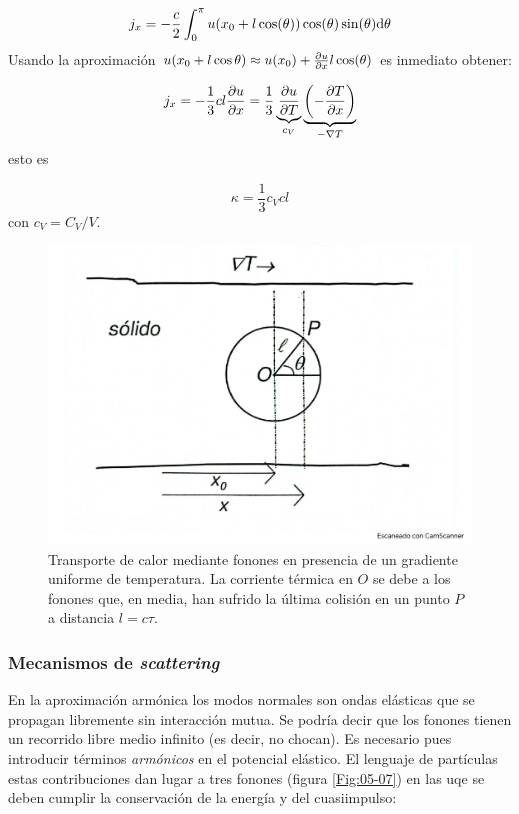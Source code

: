 \begin{equation}
    j_x = - \frac{c}{2} \int_0^\pi u (x_0 + l \cos (\theta)) \cos (\theta) \sin (\theta) \mathrm{d} \theta
\end{equation}
Usando la aproximación $u(x_0+l\cos \theta) \approx u(x_0) + \frac{\partial u}{\partial x} l \cos(\theta)$ es inmediato obtener:

\begin{equation}
j_x = - \frac{1}{3} cl \frac{\partial u}{\partial x} = \frac{1}{3} \underbrace{\frac{\partial u}{\partial T}}_{c_V} \underbrace{\left( -\frac{\partial T}{\partial x} \right)}_{-\nabla T}
\end{equation}
esto es

\begin{equation}
    \kappa = \frac{1}{3} c_V cl
\end{equation}
con $c_V=C_V/V$.

\begin{figure}[h!] \centering
    \includegraphics[scale=0.25]{Cuerpo/Ch_05/Fotos libro 6.pdf}
    \caption{Transporte de calor mediante fonones en presencia de un gradiente uniforme de temperatura. La corriente térmica en $O$ se debe a los fonones que, en media, han sufrido la última colisión en un punto $P$ a distancia $l=c\tau$.}
    \label{Fig:05-06}
\end{figure}    
 
\subsubsection{Mecanismos de \textit{scattering}}

En la aproximación armónica los modos normales son ondas elásticas que se propagan libremente sin interacción mutua. Se podría decir que los fonones tienen un recorrido libre medio infinito (es decir, no chocan). Es necesario pues introducir términos \textit{armónicos} en el potencial elástico. El lenguaje de partículas estas contribuciones dan lugar a tres fonones (figura \ref{Fig:05-07}) en las uqe se deben cumplir la conservación de la energía y del cuasiimpulso:

